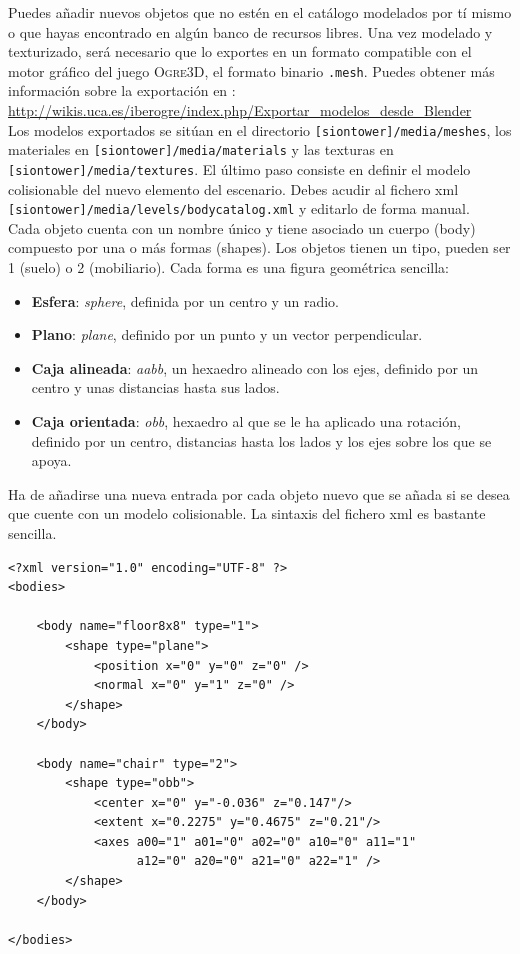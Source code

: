 \documentclass[a4paper,11pt]{article}
\begin{document}
Puedes añadir nuevos objetos que no estén en el catálogo modelados por tí
mismo o que hayas encontrado en algún banco de recursos libres. Una vez
modelado y texturizado, será necesario que lo exportes en un formato compatible
con el motor gráfico del juego \textsc{Ogre3D}, el formato binario \texttt{.mesh}.
Puedes obtener más información sobre la exportación en \wiki:\\

\url{http://wikis.uca.es/iberogre/index.php/Exportar_modelos_desde_Blender}\\

Los modelos exportados se sitúan en el directorio \texttt{[siontower]/media/meshes},
los materiales en \texttt{[siontower]/media/materials} y las texturas
en \texttt{[siontower]/media/textures}. El último paso consiste en definir
el modelo colisionable del nuevo elemento del escenario. Debes acudir al
fichero xml \texttt{[siontower]/media/levels/bodycatalog.xml} y editarlo
de forma manual.\\

Cada objeto cuenta con un nombre único y  tiene asociado un cuerpo (body)
compuesto por una o más formas (shapes). Los objetos tienen un tipo, pueden
ser 1 (suelo) o 2 (mobiliario). Cada forma es una figura geométrica
sencilla:

\begin{itemize}
    \itemsep0em
    \item \textbf{Esfera}: \textit{sphere}, definida por un centro y un
    radio.
    \item \textbf{Plano}: \textit{plane}, definido por un punto y un vector
    perpendicular.
    \item \textbf{Caja alineada}: \textit{aabb}, un hexaedro
    alineado con los ejes, definido por un centro y unas distancias hasta
    sus lados. 
    \item \textbf{Caja orientada}: \textit{obb}, hexaedro al que
    se le ha aplicado una rotación, definido por un centro, distancias
    hasta los lados y los ejes sobre los que se apoya.
\end{itemize}

Ha de añadirse una nueva entrada por cada objeto nuevo que se añada si se
desea que cuente con un modelo colisionable. La sintaxis del fichero
xml es bastante sencilla.

\begin{lstlisting}[style=xml]
<?xml version="1.0" encoding="UTF-8" ?>
<bodies>
    
    <body name="floor8x8" type="1">
        <shape type="plane">
            <position x="0" y="0" z="0" />
            <normal x="0" y="1" z="0" />
        </shape>
    </body>
    
    <body name="chair" type="2">
        <shape type="obb">
            <center x="0" y="-0.036" z="0.147"/>
            <extent x="0.2275" y="0.4675" z="0.21"/>
            <axes a00="1" a01="0" a02="0" a10="0" a11="1"
                  a12="0" a20="0" a21="0" a22="1" />
        </shape>
    </body>
    
</bodies>
\end{lstlisting}
\end{document}
